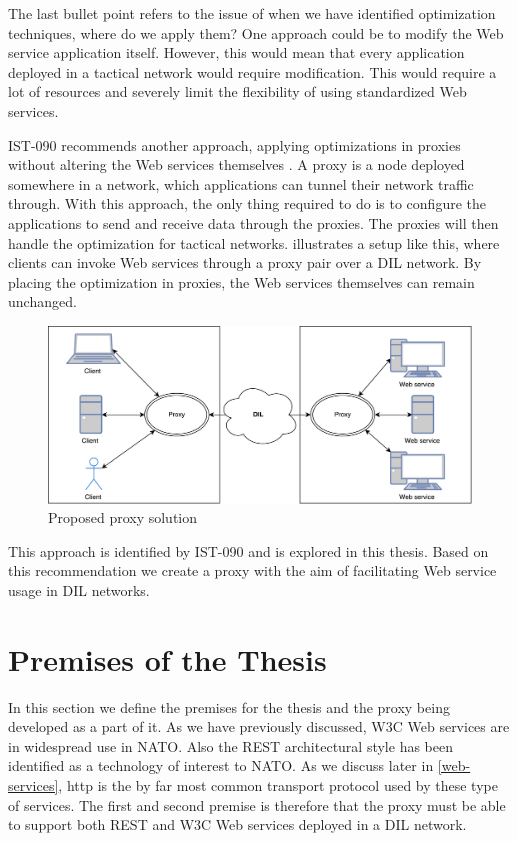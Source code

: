 The last bullet point refers to the issue of when we have identified
optimization techniques, where do we apply them? One approach could be to modify
the Web service application itself. However, this would mean that every
application deployed in a tactical network would require modification. This
would require a lot of resources and severely limit the flexibility of using
standardized Web services.

IST-090 recommends another approach, applying optimizations in proxies without
altering the Web services themselves \cite{ist-090}. A proxy is a node deployed
somewhere in a network, which applications can tunnel their network traffic
through. With this approach, the only thing required to do is to configure the
applications to send and receive data through the proxies. The proxies will then
handle the optimization for tactical networks.
 illustrates a setup like this, where
clients can invoke Web services through a proxy pair over a DIL network. By
placing the optimization in proxies, the Web services themselves can remain
unchanged.

\begin{figure}[h] \includegraphics[scale=0.5]{images/proposed_solution.pdf}
\caption{Proposed proxy solution} \label{figure-proposed-proxy-solution}
\end{figure}

This approach is identified by IST-090 and is explored in this thesis. Based on
this recommendation we create a proxy with the aim of facilitating Web service
usage in DIL networks.


\section{Premises of the Thesis}

In this section we define the premises for the thesis and the proxy being
developed as a part of it. As we have previously discussed, W3C Web services are
in widespread use in NATO. Also the REST architectural style has been identified
as a technology of interest to NATO. As we discuss later in \cref{web-services},
\gls{http} is the by far most common transport protocol used by these type of
services. The first and second premise is therefore that the proxy must be able
to support both REST and W3C Web services deployed in a DIL network.

